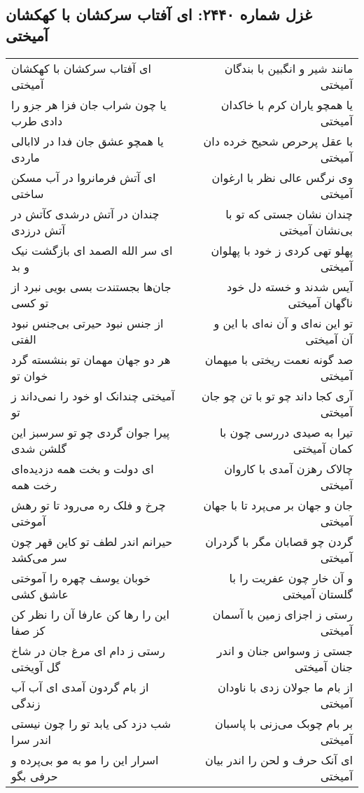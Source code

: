 \begin{center}
\section*{غزل شماره ۲۴۴۰: ای آفتاب سرکشان با کهکشان آمیختی}
\label{sec:2440}
\begin{longtable}{l p{0.5cm} r}
ای آفتاب سرکشان با کهکشان آمیختی
&&
مانند شیر و انگبین با بندگان آمیختی
\\
یا چون شراب جان فزا هر جزو را دادی طرب
&&
یا همچو یاران کرم با خاکدان آمیختی
\\
یا همچو عشق جان فدا در لاابالی ماردی
&&
با عقل پرحرص شحیح خرده دان آمیختی
\\
ای آتش فرمانروا در آب مسکن ساختی
&&
وی نرگس عالی نظر با ارغوان آمیختی
\\
چندان در آتش درشدی کآتش در آتش درزدی
&&
چندان نشان جستی که تو با بی‌نشان آمیختی
\\
ای سر الله الصمد ای بازگشت نیک و بد
&&
پهلو تهی کردی ز خود با پهلوان آمیختی
\\
جان‌ها بجستندت بسی بویی نبرد از تو کسی
&&
آیس شدند و خسته دل خود ناگهان آمیختی
\\
از جنس نبود حیرتی بی‌جنس نبود الفتی
&&
تو این نه‌ای و آن نه‌ای با این و آن آمیختی
\\
هر دو جهان مهمان تو بنشسته گرد خوان تو
&&
صد گونه نعمت ریختی با میهمان آمیختی
\\
آمیختی چندانک او خود را نمی‌داند ز تو
&&
آری کجا داند چو تو با تن چو جان آمیختی
\\
پیرا جوان گردی چو تو سرسبز این گلشن شدی
&&
تیرا به صیدی دررسی چون با کمان آمیختی
\\
ای دولت و بخت همه دزدیده‌ای رخت همه
&&
چالاک رهزن آمدی با کاروان آمیختی
\\
چرخ و فلک ره می‌رود تا تو رهش آموختی
&&
جان و جهان بر می‌پرد تا با جهان آمیختی
\\
حیرانم اندر لطف تو کاین قهر چون سر می‌کشد
&&
گردن چو قصابان مگر با گردران آمیختی
\\
خوبان یوسف چهره را آموختی عاشق کشی
&&
و آن خار چون عفریت را با گلستان آمیختی
\\
این را رها کن عارفا آن را نظر کن کز صفا
&&
رستی ز اجزای زمین با آسمان آمیختی
\\
رستی ز دام ای مرغ جان در شاخ گل آویختی
&&
جستی ز وسواس جنان و اندر جنان آمیختی
\\
از بام گردون آمدی ای آب آب زندگی
&&
از بام ما جولان زدی با ناودان آمیختی
\\
شب دزد کی یابد تو را چون نیستی اندر سرا
&&
بر بام چوبک می‌زنی با پاسبان آمیختی
\\
اسرار این را مو به مو بی‌پرده و حرفی بگو
&&
ای آنک حرف و لحن را اندر بیان آمیختی
\\
\end{longtable}
\end{center}
